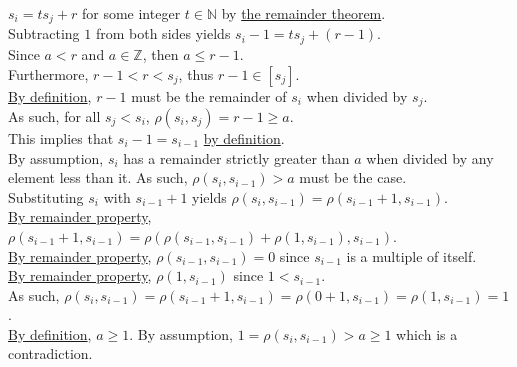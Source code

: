 \documentclass[a4paper,12pt]{article}
\begin{document}
\noindent $s_i = ts_j + r$ for some integer $t \in \mathbb{N}$ by \hyperlink{theorem:remainder_theorem}{the remainder theorem}.\\

\noindent Subtracting $1$ from both sides yields $s_i - 1 = ts_j + (r - 1)$.\\

\noindent Since $a < r$ and $a \in \mathbb{Z}$, then $a \leq r - 1$.\\

\noindent Furthermore, $r - 1 < r < s_j$, thus $r - 1 \in [s_j]$.\\

\noindent \hyperlink{theorem:remainder_theorem}{By definition}, $r - 1$ must be the remainder of $s_i$ when divided by $s_j$.\\

\noindent As such, for all $s_j < s_i$, $\rho(s_i, s_j) = r - 1 \geq a$.\\

\noindent This implies that $s_i - 1 = s_{i - 1}$ \hyperlink{definition:awkward_number_series}{by definition}.\\

\noindent By assumption, $s_i$ has a remainder strictly greater than $a$ when divided by any element less than it. As such, $\rho(s_i, s_{i - 1}) > a$ must be the case.\\

\noindent Substituting $s_i$ with $s_{i - 1} + 1$ yields $\rho(s_i, s_{i - 1}) = \rho(s_{i - 1} + 1, s_{i - 1})$.\\

\noindent \hyperlink{remainder_properties}{By remainder property}, $\rho(s_{i - 1} + 1, s_{i - 1}) = \rho(\rho(s_{i - 1}, s_{i - 1}) + \rho(1, s_{i - 1}), s_{i - 1})$.\\

\noindent \hyperlink{remainder_properties}{By remainder property}, $\rho(s_{i - 1}, s_{i - 1}) = 0$ since $s_{i - 1}$ is a multiple of itself.\\

\noindent \hyperlink{remainder_properties}{By remainder property}, $\rho(1, s_{i - 1})$ since $1 < s_{i - 1}$.\\

\noindent As such, $\rho(s_i, s_{i - 1}) = \rho(s_{i - 1} + 1, s_{i - 1}) = \rho(0 + 1, s_{i - 1}) = \rho(1, s_{i - 1}) = 1$.\\

\noindent \hyperlink{definition:awkward_number_series}{By definition}, $a \geq 1$. By assumption, $1 = \rho(s_i, s_{i - 1}) > a \geq 1$ which is a contradiction.
\end{document}
